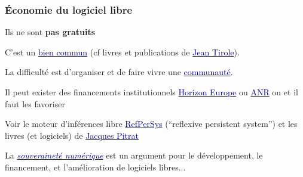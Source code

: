 \documentclass[lualatex,11pt,a4paper,svgnames,french]{beamer}
\newcommand{\clburl}[1]{{\href{https://#1}{\texttt{\relsize{-1}{\textbf{#1}}}}}}
\begin{document}
\begin{frame}\frametitle{Économie du logiciel libre}
Ils ne sont \textbf{pas gratuits}

\medskip

C'est un
\href{https://fr.wikipedia.org/wiki/Bien_commun}{\textcolor{Navy}{bien
    commun}} (cf livres et publications de
\href{https://fr.wikipedia.org/wiki/Jean_Tirole}{\textcolor{Navy}{Jean
    Tirole}}).

\medskip

La difficulté est d'organiser et de faire vivre une \href{https://fr.wikipedia.org/wiki/Communauté_du_logiciel_libre}{\textcolor{Navy}{communauté}}. 

\medskip

Il peut exister des financements institutionnels
\href{https://fr.wikipedia.org/wiki/Horizon_Europe}{\textcolor{Navy}{Horizon
    Europe}} ou
\href{https://fr.wikipedia.org/wiki/Agence_nationale_de_la_recherchee}{\textcolor{Navy}{ANR}}
ou \clburl{itea4.org} et il faut les favoriser

\medskip

Voir le moteur d'inférences libre
\href{https://github.com/RefPerSys/RefPerSys/}{\textcolor{Navy}{RefPerSys}}
(``reflexive persistent system'') et les livres (et logiciels) de
\href{https://fr.wikipedia.org/wiki/Jacques_Pitrat}{\textcolor{Navy}{Jacques
    Pitrat}}

\smallskip
  La
  \href{https://fr.wikipedia.org/wiki/Souveraineté_numérique}{\textit{\textcolor{Navy}{souveraineté
        numérique}}} est un argument pour le développement, le
  financement, et l'amélioration de logiciels libres...
\end{frame}


\end{document}
